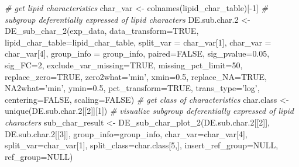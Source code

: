 \documentclass[]{article}
\newcommand{\hlnum}[1]{\textcolor[rgb]{0.816,0.125,0.439}{#1}}%
\newcommand{\hlstr}[1]{\textcolor[rgb]{0.251,0.627,0.251}{#1}}%
\newcommand{\hlcom}[1]{\textcolor[rgb]{0.502,0.502,0.502}{\textit{#1}}}%
\newcommand{\hlopt}[1]{\textcolor[rgb]{0,0,0}{#1}}%
\newcommand{\hlstd}[1]{\textcolor[rgb]{0.251,0.251,0.251}{#1}}%
\newcommand{\hlkwc}[1]{\textcolor[rgb]{0.251,0.251,0.251}{#1}}%
\newcommand{\hlkwd}[1]{\textcolor[rgb]{0.878,0.439,0.125}{#1}}%
\newenvironment{Shaded}{\begin{myshaded}}{\end{myshaded}}
\newcommand{\KeywordTok}[1]{\hlkwd{#1}}
\newcommand{\DataTypeTok}[1]{\hlkwc{#1}}
\newcommand{\DecValTok}[1]{\hlnum{#1}}
\newcommand{\FloatTok}[1]{\hlnum{#1}}
\newcommand{\StringTok}[1]{\hlstr{#1}}
\newcommand{\CommentTok}[1]{\hlcom{#1}}
\newcommand{\OtherTok}[1]{{#1}}
\newcommand{\OperatorTok}[1]{\hlopt{#1}}
\newcommand{\NormalTok}[1]{\hlstd{#1}}
\begin{document}
\begin{Shaded}
\begin{Highlighting}[]
\CommentTok{# get lipid characteristics}
\NormalTok{char_var <-}\StringTok{ }\KeywordTok{colnames}\NormalTok{(lipid_char_table)[}\OperatorTok{-}\DecValTok{1}\NormalTok{]}
\CommentTok{# subgroup deferentially expressed of lipid characters}
\NormalTok{DE.sub.char}\FloatTok{.2}\NormalTok{ <-}\StringTok{ }\KeywordTok{DE_sub_char_2}\NormalTok{(exp_data, }\DataTypeTok{data_transform=}\OtherTok{TRUE}\NormalTok{,}
                               \DataTypeTok{lipid_char_table=}\NormalTok{lipid_char_table,}
                               \DataTypeTok{split_var =}\NormalTok{ char_var[}\DecValTok{1}\NormalTok{],}
                               \DataTypeTok{char_var =}\NormalTok{ char_var[}\DecValTok{4}\NormalTok{],}
                               \DataTypeTok{group_info =}\NormalTok{ group_info,}
                               \DataTypeTok{paired=}\OtherTok{FALSE}\NormalTok{, }\DataTypeTok{sig_pvalue=}\FloatTok{0.05}\NormalTok{,}
                               \DataTypeTok{sig_FC=}\DecValTok{2}\NormalTok{, }\DataTypeTok{exclude_var_missing=}\OtherTok{TRUE}\NormalTok{,}
                               \DataTypeTok{missing_pct_limit=}\DecValTok{50}\NormalTok{,}
                               \DataTypeTok{replace_zero=}\OtherTok{TRUE}\NormalTok{, }\DataTypeTok{zero2what=}\StringTok{'min'}\NormalTok{,}
                               \DataTypeTok{xmin=}\FloatTok{0.5}\NormalTok{, }\DataTypeTok{replace_NA=}\OtherTok{TRUE}\NormalTok{,}
                               \DataTypeTok{NA2what=}\StringTok{'min'}\NormalTok{, }\DataTypeTok{ymin=}\FloatTok{0.5}\NormalTok{,}
                               \DataTypeTok{pct_transform=}\OtherTok{TRUE}\NormalTok{, }\DataTypeTok{trans_type=}\StringTok{'log'}\NormalTok{,}
                               \DataTypeTok{centering=}\OtherTok{FALSE}\NormalTok{, }\DataTypeTok{scaling=}\OtherTok{FALSE}\NormalTok{)}
\CommentTok{# get class of characteristics}
\NormalTok{char.class <-}\StringTok{ }\KeywordTok{unique}\NormalTok{(DE.sub.char}\FloatTok{.2}\NormalTok{[[}\DecValTok{2}\NormalTok{]][}\DecValTok{1}\NormalTok{])}
\CommentTok{# visualize subgroup deferentially expressed of lipid characters}
\NormalTok{sub_char_result <-}\StringTok{ }\KeywordTok{DE_sub_char_plot_2}\NormalTok{(DE.sub.char}\FloatTok{.2}\NormalTok{[[}\DecValTok{2}\NormalTok{]],}
\NormalTok{                                      DE.sub.char}\FloatTok{.2}\NormalTok{[[}\DecValTok{3}\NormalTok{]],}
                                      \DataTypeTok{group_info=}\NormalTok{group_info,}
                                      \DataTypeTok{char_var=}\NormalTok{char_var[}\DecValTok{4}\NormalTok{],}
                                      \DataTypeTok{split_var=}\NormalTok{char_var[}\DecValTok{1}\NormalTok{],}
                                      \DataTypeTok{split_class=}\NormalTok{char.class[}\DecValTok{5}\NormalTok{,],}
                                      \DataTypeTok{insert_ref_group=}\OtherTok{NULL}\NormalTok{, }\DataTypeTok{ref_group=}\OtherTok{NULL}\NormalTok{)}
\end{Highlighting}
\end{Shaded}
\end{document}
